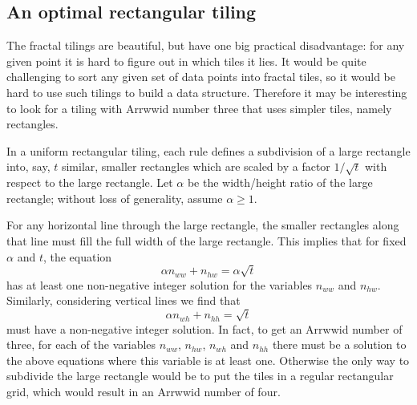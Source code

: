 \documentclass[11pt,a4paper]{article}
\begin{document}
\subsection{An optimal rectangular tiling}

The fractal tilings are beautiful, but have one big practical disadvantage: for any given point it is hard to figure out in which tiles it lies. It would be quite challenging to sort any given set of data points into fractal tiles, so it would be hard to use such tilings to build a data structure. Therefore it may be interesting to look for a tiling with Arrwwid number three that uses simpler tiles, namely rectangles.

In a uniform rectangular tiling, each rule defines a subdivision of a large rectangle into, say, $t$ similar, smaller rectangles which are scaled by a factor $1/\sqrt{t}$ with respect to the large rectangle. Let $\alpha$ be the width/height ratio of the large rectangle; without loss of generality, assume $\alpha \geq 1$.

For any horizontal line through the large rectangle, the smaller rectangles along that line must fill the full width of the large rectangle. This implies that for fixed $\alpha$ and $t$,  the equation\begin{equation}\label{eq:fillwidth}
\alpha n_{ww} + n_{hw} = \alpha \sqrt{t}
\end{equation}
has at least one non-negative integer solution for the variables $n_{ww}$ and $n_{hw}$. Similarly, considering vertical lines we find that\begin{equation}\label{eq:fillheight}
\alpha n_{wh} + n_{hh} = \sqrt{t}
\end{equation}
must have a non-negative integer solution.
In fact, to get an Arrwwid number of three, for each of the variables $n_{ww}$, $n_{hw}$, $n_{wh}$ and $n_{hh}$ there must be a solution to the above equations where this variable is at least one. Otherwise the only way to subdivide the large rectangle would be to put the tiles in a regular rectangular grid, which would result in an Arrwwid number of four.
\end{document}

